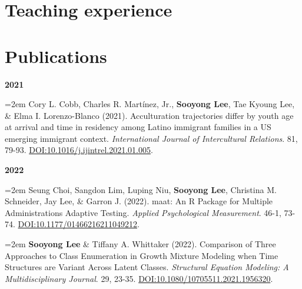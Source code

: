 \documentclass[11pt,letterpaper,]{awesome-me}
\begin{document}
\newpage

\hypertarget{teaching-experience}{%
\section{Teaching experience}\label{teaching-experience}}

\begin{cventries} 

 \end{cventries}

\vspace{-2em}

\hypertarget{publications}{%
\section{Publications}\label{publications}}

\setlength{\leftskip}{0cm}

\textbf{2021}

\setlength{\leftskip}{0.5cm}

\hangindent=2em  Cory L. Cobb, Charles R. Martínez, Jr.,
\textbf{Sooyong Lee}, Tae Kyoung Lee, \& Elma I. Lorenzo-Blanco (2021).
Acculturation trajectories differ by youth age at arrival and time in
residency among Latino immigrant families in a US emerging immigrant
context. \emph{International Journal of Intercultural Relations}. 81,
79-93. \url{DOI:10.1016/j.ijintrel.2021.01.005}.

\setlength{\leftskip}{0cm}

\textbf{2022}

\setlength{\leftskip}{0.5cm}

\hangindent=2em  Seung Choi, Sangdon Lim, Luping Niu,
\textbf{Sooyong Lee}, Christina M. Schneider, Jay Lee, \& Garron J.
(2022). maat: An R Package for Multiple Administrations Adaptive
Testing. \emph{Applied Psychological Measurement}. 46-1, 73-74.
\url{DOI:10.1177/01466216211049212}.

\hangindent=2em  \textbf{Sooyong Lee} \& Tiffany A.
Whittaker (2022). Comparison of Three Approaches to Class Enumeration in
Growth Mixture Modeling when Time Structures are Variant Across Latent
Classes. \emph{Structural Equation Modeling: A Multidisciplinary
Journal}. 29, 23-35. \url{DOI:10.1080/10705511.2021.1956320}.
\end{document}
